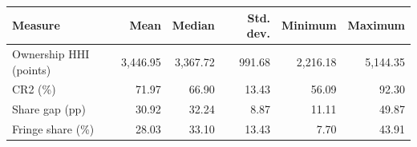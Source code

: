 \begin{tabular}{@{}lrrrrr@{}}
\toprule
Measure & Mean & Median & Std. dev. & Minimum & Maximum \\
\midrule
Ownership HHI (points) & 3,446.95 & 3,367.72 & 991.68 & 2,216.18 & 5,144.35 \\
CR2 (\%) & 71.97 & 66.90 & 13.43 & 56.09 & 92.30 \\
Share gap (pp) & 30.92 & 32.24 & 8.87 & 11.11 & 49.87 \\
Fringe share (\%) & 28.03 & 33.10 & 13.43 & 7.70 & 43.91 \\
\bottomrule
\end{tabular}
